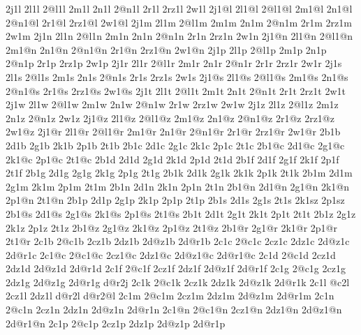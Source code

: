{  2j1l    2l1l    2@l1l    2m1l    2n1l    2@n1l    2r1l    2rz1l    2w1l
  2j1@l   2l1@l   2@l1@l   2m1@l   2n1@l   2@n1@l   2r1@l   2rz1@l   2w1@l
  2j1m    2l1m    2@l1m    2m1m    2n1m    2@n1m    2r1m    2rz1m    2w1m
  2j1n    2l1n    2@l1n    2m1n    2n1n    2@n1n    2r1n    2rz1n    2w1n    
  2j1@n   2l1@n   2@l1@n   2m1@n   2n1@n   2@n1@n   2r1@n   2rz1@n   2w1@n
  2j1p    2l1p    2@l1p    2m1p    2n1p    2@n1p    2r1p    2rz1p    2w1p
  2j1r    2l1r    2@l1r    2m1r    2n1r    2@n1r    2r1r    2rz1r    2w1r
  2j1s    2l1s    2@l1s    2m1s    2n1s    2@n1s    2r1s    2rz1s    2w1s
  2j1@s   2l1@s   2@l1@s   2m1@s   2n1@s   2@n1@s   2r1@s   2rz1@s   2w1@s
  2j1t    2l1t    2@l1t    2m1t    2n1t    2@n1t    2r1t    2rz1t    2w1t
  2j1w    2l1w    2@l1w    2m1w    2n1w    2@n1w    2r1w    2rz1w    2w1w
  2j1z    2l1z    2@l1z    2m1z    2n1z    2@n1z                     2w1z
  2j1@z   2l1@z   2@l1@z   2m1@z   2n1@z   2@n1@z   2r1@z   2rz1@z   2w1@z
  2j1@r   2l1@r   2@l1@r   2m1@r   2n1@r   2@n1@r   2r1@r   2rz1@r   2w1@r
%
  2b1b    2d1b    2g1b     2k1b    2p1b    2t1b      
  2b1c    2d1c    2g1c     2k1c    2p1c    2t1c
  2b1@c   2d1@c   2g1@c    2k1@c   2p1@c   2t1@c
  2b1d    2d1d    2g1d     2k1d    2p1d    2t1d
  2b1f    2d1f    2g1f     2k1f    2p1f    2t1f
  2b1g    2d1g    2g1g     2k1g    2p1g    2t1g
  2b1k    2d1k    2g1k     2k1k    2p1k    2t1k
  2b1m    2d1m    2g1m     2k1m    2p1m    2t1m
  2b1n    2d1n             2k1n    2p1n    2t1n
  2b1@n   2d1@n   2g1@n    2k1@n   2p1@n   2t1@n
  2b1p    2d1p    2g1p     2k1p    2p1p    2t1p
  2b1s    2d1s    2g1s                     2t1s
                           2k1sz   2p1sz
  2b1@s   2d1@s   2g1@s    2k1@s   2p1@s   2t1@s
  2b1t    2d1t    2g1t     2k1t    2p1t    2t1t
  2b1z            2g1z     2k1z    2p1z    2t1z
  2b1@z           2g1@z    2k1@z   2p1@z   2t1@z
  2b1@r           2g1@r    2k1@r   2p1@r   2t1@r
%
  2c1b    2@c1b   2cz1b    2dz1b   2d@z1b  2d@r1b
  2c1c    2@c1c   2cz1c    2dz1c   2d@z1c  2d@r1c
  2c1@c   2@c1@c  2cz1@c   2dz1@c  2d@z1@c 2d@r1@c
  2c1d    2@c1d   2cz1d    2dz1d   2d@z1d  2d@r1d
  2c1f    2@c1f   2cz1f    2dz1f   2d@z1f  2d@r1f
  2c1g    2@c1g   2cz1g    2dz1g   2d@z1g  2d@r1g                         
                                            d@r2j
  2c1k    2@c1k   2cz1k    2dz1k   2d@z1k  2d@r1k
  2c1l     @c2l   2cz1l    2dz1l            d@r2l
                                            d@r2@l
  2c1m    2@c1m   2cz1m    2dz1m   2d@z1m  2d@r1m
  2c1n    2@c1n   2cz1n    2dz1n   2d@z1n  2d@r1n
  2c1@n   2@c1@n  2cz1@n   2dz1@n  2d@z1@n 2d@r1@n
  2c1p    2@c1p   2cz1p    2dz1p   2d@z1p  2d@r1p
}
